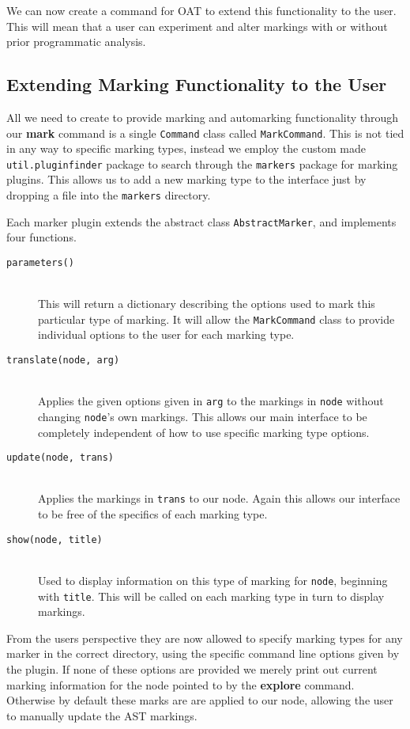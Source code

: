 \documentclass[twoside,a4paper]{report}
\begin{document}
We can now create a command for OAT to extend this functionality to the user. This will mean that a user can experiment and alter markings
with or without prior programmatic analysis.

\subsection{Extending Marking Functionality to the User}

All we need to create to provide marking and automarking functionality through our \textbf{mark} command is a single \texttt{Command}
class called \texttt{MarkCommand}. This is not tied in any way to specific marking types, instead we employ the custom made
\texttt{util.pluginfinder} package to search through the \texttt{markers} package for marking plugins. This allows us to add a new
marking type to the interface just by dropping a file into the \texttt{markers} directory.

Each marker plugin extends the abstract class \texttt{AbstractMarker}, and implements four functions.

\begin{description}
\item[\texttt{parameters()}] \hfill \\
This will return a dictionary describing the options used to mark this particular type of marking. It will allow the \texttt{MarkCommand}
class to provide individual options to the user for each marking type.
\item[\texttt{translate(node, arg)}] \hfill \\
Applies the given options given in \texttt{arg} to the markings in \texttt{node} without changing \texttt{node}'s own markings. This allows
our main interface to be completely independent of how to use specific marking type options.
\item[\texttt{update(node, trans)}] \hfill \\
Applies the markings in \texttt{trans} to our node. Again this allows our interface to be free of the specifics of each marking type.
\item[\texttt{show(node, title)}] \hfill \\
Used to display information on this type of marking for \texttt{node}, beginning with \texttt{title}. This will be called on each marking
type in turn to display markings.
\end{description}

From the users perspective they are now allowed to specify marking types for any marker in the correct directory, using the specific command
line options given by the plugin. If none of these options are provided we merely print out current marking information for the node pointed to
by the \textbf{explore} command. Otherwise by default these marks are are applied to our node, allowing the user to manually update the AST
markings.
\end{document}
